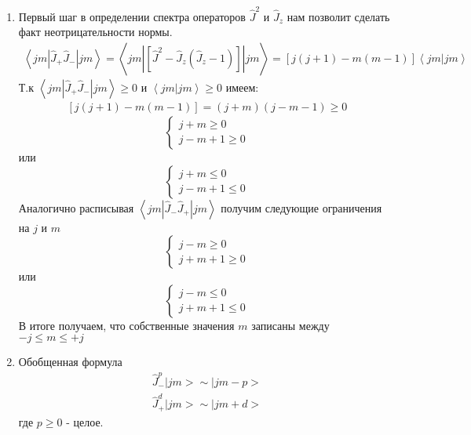 \documentclass[__main__.tex]{subfiles}
\begin{document}
	\begin{enumerate}
		\item Первый шаг в определении спектра операторов $\hat{J}^2$ и $\hat{J}_z$ нам позволит сделать факт неотрицательности нормы.
			\begin{gather*}
				\left<jm|\hat{J}_{+}\hat{J}_{-}|jm\right> = \left<jm\left|\left[\hat{J}^2-\hat{J}_z\left(\hat{J}_z-1\right)\right]\right|jm\right> = \left[j(j+1)-m(m-1)\right]\left<jm|jm\right>
			\end{gather*}
			Т.к $\left<jm|\hat{J}_{+}\hat{J}_{-}|jm\right> \geq 0$ и $\left<jm|jm\right> \geq 0$ имеем:
			\begin{gather*}
				\left[j(j+1)-m(m-1)\right] = (j+m)(j-m-1) \geq 0
			\end{gather*}
			\begin{equation*}
				\begin{cases}
					j+m \geq 0\\
					j-m+1 \geq 0
				\end{cases}
			\end{equation*}
			или
			\begin{equation*}
				\begin{cases}
					j+m \leq 0\\
					j-m+1 \leq 0
				\end{cases}
			\end{equation*}
			Аналогично расписывая $	\left<jm|\hat{J}_{-}\hat{J}_{+}|jm\right>$ получим следующие ограничения на $j$ и $m$
			\begin{equation*}
				\begin{cases}
					j-m \geq 0\\
					j+m+1 \geq 0
				\end{cases}
			\end{equation*}
			или
			\begin{equation*}
				\begin{cases}
					j-m \leq 0\\
					j+m+1 \leq 0
				\end{cases}
			\end{equation*}
			В итоге получаем, что собственные значения $m$ записаны между $-j\leq m \leq +j$
		\item Обобщенная формула
			\begin{gather*}
				\hat{J}^p_{-}|jm> \sim |jm-p>\\
				\hat{J}^d_{+}|jm> \sim |jm+d>
			\end{gather*}  	
			где $p \geq 0$ - целое.\\

\end{enumerate}
\end{document}
